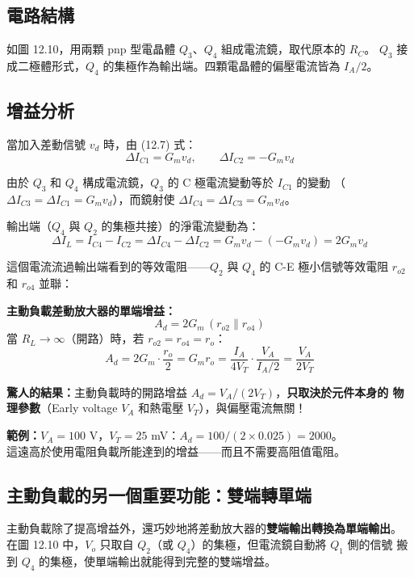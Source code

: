 \documentclass[12pt]{article}
\begin{document}
\subsection*{電路結構}

如圖 12.10，用兩顆 pnp 型電晶體 $Q_3$、$Q_4$ 組成電流鏡，取代原本的 $R_C$。
$Q_3$ 接成二極體形式，$Q_4$ 的集極作為輸出端。四顆電晶體的偏壓電流皆為
$I_A/2$。

\subsection*{增益分析}

當加入差動信號 $v_d$ 時，由 (12.7) 式：
\[
  \Delta I_{C1} = G_m v_d, \qquad \Delta I_{C2} = -G_m v_d
\]

\noindent 由於 $Q_3$ 和 $Q_4$ 構成電流鏡，$Q_3$ 的 C 極電流變動等於 $I_{C1}$ 的變動
（$\Delta I_{C3} = \Delta I_{C1} = G_m v_d$），而鏡射使 $\Delta I_{C4} = \Delta I_{C3} = G_m v_d$。

輸出端（$Q_4$ 與 $Q_2$ 的集極共接）的淨電流變動為：
\[
  \Delta I_L = I_{C4} - I_{C2} = \Delta I_{C4} - \Delta I_{C2} = G_m v_d - (-G_m v_d) = 2G_m v_d
\]

\noindent 這個電流流過輸出端看到的等效電阻——$Q_2$ 與 $Q_4$ 的 C-E 極小信號等效電阻
$r_{o2}$ 和 $r_{o4}$ 並聯：

\begin{formulabox}
\textbf{主動負載差動放大器的單端增益：}
\[
  A_d = 2G_m\,(r_{o2} \| r_{o4}) \tag{12.40}
\]
當 $R_L \to \infty$（開路）時，若 $r_{o2} = r_{o4} = r_o$：
\[
  A_d = 2G_m \cdot \frac{r_o}{2} = G_m r_o = \frac{I_A}{4V_T}\cdot\frac{V_A}{I_A/2} = \frac{V_A}{2V_T} \tag{12.42}
\]
\end{formulabox}

\noindent\textbf{驚人的結果：}主動負載時的開路增益 $A_d = V_A/(2V_T)$，\textbf{只取決於元件本身的
物理參數}（Early voltage $V_A$ 和熱電壓 $V_T$），與偏壓電流無關！

\medskip
\noindent\textbf{範例：}$V_A = 100$ V，$V_T = 25$ mV：$A_d = 100/(2 \times 0.025) = 2000$。\\
這遠高於使用電阻負載所能達到的增益——而且不需要高阻值電阻。

\subsection*{主動負載的另一個重要功能：雙端轉單端}

主動負載除了提高增益外，還巧妙地將差動放大器的\textbf{雙端輸出轉換為單端輸出}。
在圖 12.10 中，$V_o$ 只取自 $Q_2$（或 $Q_4$）的集極，但電流鏡自動將 $Q_1$ 側的信號
搬到 $Q_4$ 的集極，使單端輸出就能得到完整的雙端增益。
\end{document}
